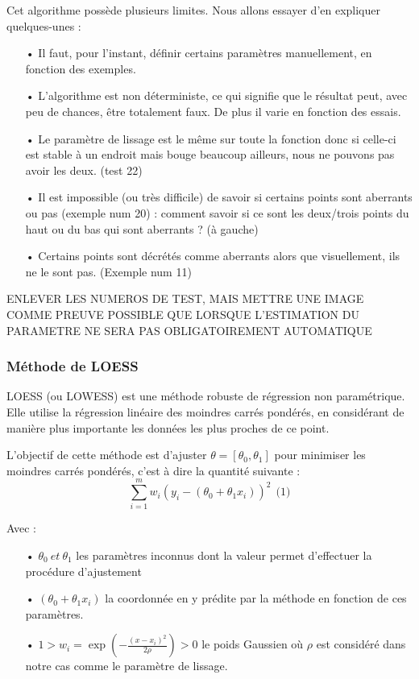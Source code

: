 \documentclass[a4paper,12pt]{article} %
\begin{document}
                    Cet algorithme possède plusieurs limites. Nous allons essayer d'en expliquer quelques-unes :
                    \begin{itemize}
                    \item[•] Il faut, pour l'instant, définir certains paramètres manuellement, en fonction des exemples.
                    \item[•] L'algorithme est non déterministe, ce qui signifie que le résultat peut, avec peu de chances, être totalement faux. De plus il varie en fonction des essais.
                    \item[•] Le paramètre de lissage est le même sur toute la fonction donc si celle-ci est stable à un endroit mais bouge beaucoup ailleurs, nous ne pouvons pas avoir les deux. (test 22)
                    \item[•] Il est impossible (ou très difficile) de savoir si certains points sont aberrants ou pas (exemple num 20) : comment savoir si ce sont les deux/trois points du haut ou du bas qui sont aberrants ? (à gauche)
                    \item[•] Certains points sont décrétés comme aberrants alors que visuellement, ils ne le sont pas. (Exemple num 11)\\
                    \end{itemize}
                    ENLEVER LES NUMEROS DE TEST, MAIS METTRE UNE IMAGE COMME PREUVE
                   POSSIBLE QUE LORSQUE L'ESTIMATION DU PARAMETRE NE SERA PAS OBLIGATOIREMENT AUTOMATIQUE
                    
                    
			    \subsubsection{\label{partie_loess}Méthode de LOESS}
			    
                    LOESS (ou LOWESS) est une méthode robuste de régression non paramétrique. Elle utilise la régression linéaire des moindres carrés pondérés, en considérant de manière plus importante les données les plus proches de ce point.
                    
                    L'objectif de cette méthode est d'ajuster $\theta = [\theta_0, \theta_1]$ pour minimiser les moindres carrés pondérés, c'est à dire la quantité suivante : \[\sum_{i=1}^m w_i ( y_i - (\theta_0 + \theta_1 x_i))^2 \ \ \text{(1)}\]
                    
                    Avec : 
                    \begin{itemize}
                        \item[•]  $\theta_0 \ et \ \theta_1$ les paramètres inconnus dont la valeur permet d'effectuer la procédure d'ajustement  
                        \item[•]  $(\theta_0 + \theta_1 x_i)$ la coordonnée en y prédite par la méthode en fonction de ces paramètres.
                        \item[•]  $1 > w_i = \exp \left( - \frac{(x -x_i)^2}{2 \rho} \right) > 0$ le poids Gaussien où  $\rho$ est considéré dans notre cas comme le paramètre de lissage.
                    \end{itemize}
                    
\end{document}

